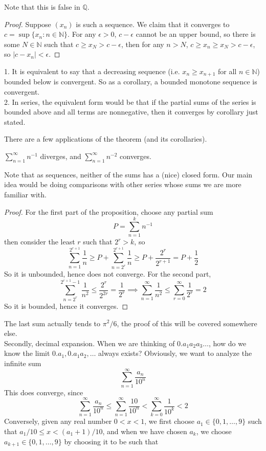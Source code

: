 Note that this is false in $\mathbb Q$.
\begin{proof}
    Suppose $(x_n)$ is such a sequence.
    We claim that it converges to $c=\sup\{x_n:n\in\mathbb N\}$.
    For any $\epsilon>0$, $c-\epsilon$ cannot be an upper bound, so there is some $N\in\mathbb N$ such that $c\ge x_N>c-\epsilon$, then for any $n>N$, $c\ge x_n\ge x_N>c-\epsilon$, so $|c-x_n|<\epsilon$.
\end{proof}
\begin{remark}
    1. It is equivalent to say that a decreasing sequence (i.e. $x_n\ge x_{n+1}$ for all $n\in\mathbb N$) bounded below is convergent.
    So as a corollary, a bounded monotone sequence is convergent.\\
    2. In series, the equivalent form would be that if the partial sums of the series is bounded above and all terms are nonnegative, then it converges by corollary just stated.
\end{remark}
There are a few applications of the theorem (and its corollaries).
\begin{proposition}
    $\sum_{n=1}^\infty n^{-1}$ diverges, and $\sum_{n=1}^\infty n^{-2}$ converges.
\end{proposition}
Note that as sequences, neither of the sums has a (nice) closed form.
Our main idea would be doing comparisons with other series whose sums we are more familiar with.
\begin{proof}
    For the first part of the proposition, choose any partial sum
    $$P=\sum_{n=1}^k n^{-1}$$
    then consider the least $r$ such that $2^{r}>k$, so
    $$\sum_{n=1}^{2^{r+1}} \frac{1}{n}\ge P+\sum_{n=2^r}^{2^{r+1}} \frac{1}{n}\ge P+\frac{2^{r}}{2^{r+1}}=P+\frac{1}{2}$$
    So it is unbounded, hence does not converge.
    For the second part,
    $$\sum_{n=2^r}^{2^{r+1}-1} \frac{1}{n^2}\le \frac{2^r}{2^{2r}}=\frac{1}{2^r}\implies \sum_{n=1}^\infty\frac{1}{n^2}\le \sum_{r=0}^\infty\frac{1}{2^r}=2$$
    So it is bounded, hence it converges.
\end{proof}
The last sum actually tends to $\pi^2/6$, the proof of this will be covered somewhere else.\\
Secondly, decimal expansion.
When we are thinking of $0.a_1a_2a_3\ldots$, how do we know the limit $0.a_1,0.a_1a_2,\ldots$ always exists?
Obviously, we want to analyze the infinite sum
$$\sum_{n=1}^\infty \frac{a_n}{10^n}$$
This does converge, since
$$\sum_{n=1}^\infty \frac{a_n}{10^n}\le \sum_{n=1}^\infty \frac{10}{10^n}<\sum_{k=0}^\infty\frac{1}{10^k}<2$$
Conversely, given any real number $0<x<1$, we first choose $a_1\in\{0,1,\ldots,9\}$ such that $a_1/10\le x<(a_1+1)/10$, and when we have chosen $a_k$, we choose $a_{k+1}\in\{0,1,\ldots,9\}$ by choosing it to be such that
